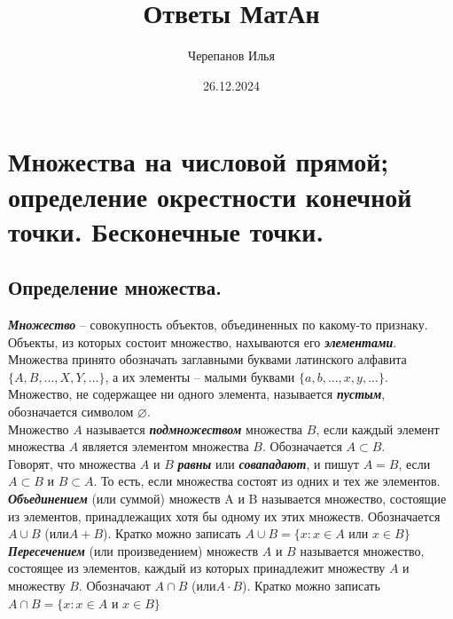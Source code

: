 \documentclass[12pt, fleqn]{article}
\title{Ответы МатАн}
\date{26.12.2024}
\author{Черепанов Илья}
\begin{document}
	\maketitle
	\clearpage
	\tableofcontents{}
	\clearpage
	\section{Множества на числовой прямой; определение окрестности конечной точки. Бесконечные точки.}
	\subsection{Определение множества.}
	\textbf{\textit{Множество}} -- совокупность объектов, объединенных по какому-то признаку.
	\\
	Объекты, из которых состоит множество, нахываются его \textbf{\textit{элементами}}.
	\\
	Множества принято обозначать заглавными буквами латинского алфавита $\{A,B,...,X,Y,...\}$, а их элементы -- малыми буквами $\{a,b,...,x,y,...\}$.
	\\
	Множество, не содержащее ни одного элемента, называется \textbf{\textit{пустым}}, обозначается символом $\varnothing$.
	\\
	Множество $A$ называется \textbf{\textit{подмножеством}} множества $B$, если каждый элемент множества $A$ является элементом множества $B$. Обозначается $A \subset B$.
	\\
	Говорят, что множества $A$ и $B$ \textbf{\textit{равны}} или \textbf{\textit{совападают}}, и пишут $A=B$, если $A \subset B$ и $B \subset A$. То есть, если множества состоят из одних и тех же элементов.
	\\
	\textbf{\textit{Объединением}} (или суммой) множеств A и B называется множество, состоящие из элементов, принадлежащих хотя бы одному их этих множеств. Обозначается $A \cup B$ (или$A+B$). Кратко можно записать $A\cup B = \{x\colon x\in A$ или $x \in B\}$
	\\
	\textbf{\textit{Пересечением}} (или произведением) множеств $A$ и $B$ называется множество, состоящее из элементов, каждый из которых принадлежит множеству $A$ и множеству $B$. Обозначают $A \cap B$ (или$A \cdot B$). Кратко можно записать $A\cap B = \{x\colon x\in A$ и $x \in B\}$
\end{document}
